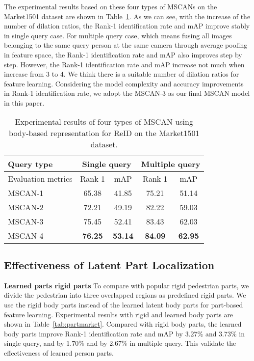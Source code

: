 \documentclass[10pt,twocolumn,letterpaper]{article}
\begin{document}
The experimental results based on these four types of MSCANs on the Market1501 dataset are shown in Table~\ref{tab:mscanmarket}.
As we can see, with the increase of the number of dilation ratios, the Rank-1 identification rate and mAP improve stably in single query case.
For multiple query case, which means fusing all images belonging to the same query person at the same camera through average pooling in feature space, the Rank-1 identification rate and mAP also improves step by step.
However, the Rank-1 identification rate and mAP increase not much when  increase from 3 to 4.
We think there is a suitable number of dilation ratios for feature learning.
Considering the model complexity and accuracy improvements in Rank-1 identification rate, we adopt the MSCAN-3 as our final MSCAN model in this paper.
\begin{table}[htbp]
  \begin{center}
    \scriptsize
    \begin{tabular}{|l|cc|cc|}
    \hline
    Query type & \multicolumn{2}{c|}{Single query} & \multicolumn{2}{c|}{Multiple query} \\
    \hline
    Evaluation metrics & Rank-1    & mAP   & Rank-1    & mAP \\
    \hline
    \hline
    MSCAN-1 & 65.38  & 41.85  & 75.21  & 51.14  \\
    MSCAN-2 & 72.21  & 49.19  & 82.22  & 59.03  \\
    MSCAN-3 & 75.45  & 52.41  & 83.43  & 62.03  \\
    MSCAN-4 & \textbf{76.25}  & \textbf{53.14}  & \textbf{84.09}  & \textbf{62.95}   \\
    \hline
    \end{tabular}\end{center}
  \vspace{-0.5em}
  \caption{Experimental results of four types of MSCAN using body-based representation for ReID on the Market1501 dataset.}
  \vspace{-1em}
  \label{tab:mscanmarket}\end{table}


\subsection{Effectiveness of Latent Part Localization}
\label{exp:efflpl}

\textbf{Learned parts \vs rigid parts}
To compare with popular rigid pedestrian parts, we divide the pedestrian into three overlapped regions as predefined rigid parts.
We use the rigid body parts instead of the learned latent body parts for part-based feature learning.
Experimental results with rigid and learned body parts are shown in Table~\ref{tab:partmarket}.
Compared with rigid body parts, the learned body parts improve Rank-1 identification rate and mAP
by 3.27\% and 3.73\% in single query, and by 1.70\% and by 2.67\% in multiple query.
This validate the effectiveness of learned person parts.
\end{document}
